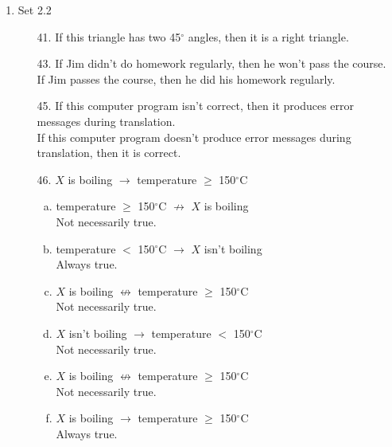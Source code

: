 \documentclass[letterpaper]{article}
\begin{document}
\begin{enumerate}
\begin{enumerate}
			\item Set 2.2
			\begin{itemize}
				\item [41.] If this triangle has two 45$^\circ$ angles, then it is a right triangle.
				\item [43.] 
				If Jim didn't do homework regularly, then he won't pass the course. \\
				If Jim passes the course, then he did his homework regularly.
				\item [45.]
				If this computer program isn't correct, then it produces error messages during translation. \\
				If this computer program doesn't produce error messages during translation, then it is correct.
				\item [46.] $X$ is boiling $\rightarrow$ temperature $\geq$ 150$^\circ$C
				\begin{enumerate}[(a)]
					\item 
					temperature $\geq$ 150$^\circ$C $\not\rightarrow$ $X$ is boiling \\
					Not necessarily true.
					\item 
					temperature $<$ 150$^\circ$C $\rightarrow$ $X$ isn't boiling \\
					Always true.
					\item
					$X$ is boiling $\not\leftrightarrow$ temperature $\geq$ 150$^\circ$C \\
					Not necessarily true.
					\item
					$X$ isn't boiling $\rightarrow$ temperature $<$ 150$^\circ$C \\
					Not necessarily true.
					\item
					$X$ is boiling $\not\leftrightarrow$ temperature $\geq$ 150$^\circ$C \\
					Not necessarily true.
					\item
					$X$ is boiling $\rightarrow$ temperature $\geq$ 150$^\circ$C \\
					Always true.
				\end{enumerate}
			\end{itemize}
		\end{enumerate}
		\newpage
		

\end{enumerate}
\end{document}
